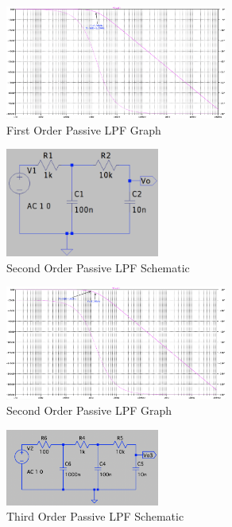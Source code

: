 \documentclass[CMPE]{KGCOEReport}
\begin{document}
\begin{figure}[H]
	\centering
  	\includegraphics[width=0.65\textwidth]{Screenshots/q4_first_order_graph}  
	\caption{First Order Passive LPF Graph}
	\label{q4_graph_1}
\end{figure}

\begin{figure}[H]
	\centering
  	\includegraphics[width=0.45\textwidth]{Screenshots/q4_second_order_schematic}  
	\caption{Second Order Passive LPF Schematic}
	\label{q4_schematic_2}
\end{figure}

\begin{figure}[H]
	\centering
  	\includegraphics[width=0.65\textwidth]{Screenshots/q4_second_order_graph}  
	\caption{Second Order Passive LPF Graph}
	\label{q4_graph_2}
\end{figure}

\begin{figure}[H]
	\centering
  	\includegraphics[width=0.45\textwidth]{Screenshots/q4_third_order_schematic}  
	\caption{Third Order Passive LPF Schematic}
	\label{q4_schematic_3}
\end{figure}
\end{document}
